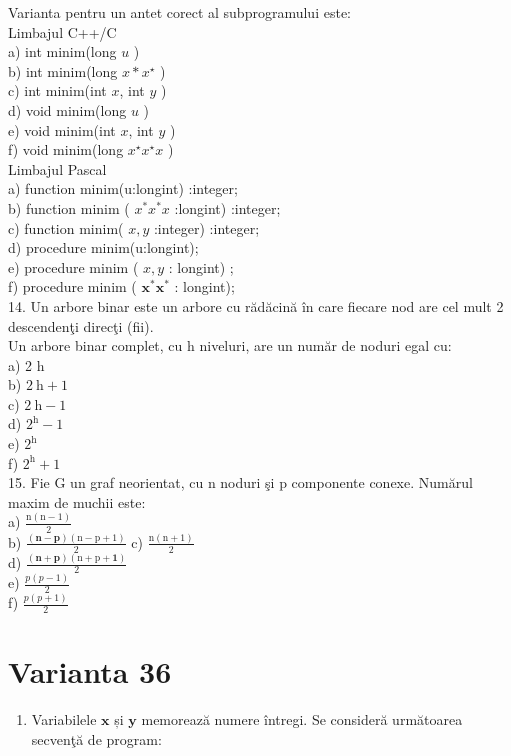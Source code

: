 \documentclass[10pt]{article}
\begin{document}
Varianta pentru un antet corect al subprogramului este:\\
Limbajul C++/C\\
a) int minim(long $u$ )\\
b) int minim(long $x * x^{\star}$ )\\
c) int minim(int $x$, int $y$ )\\
d) void minim(long $u$ )\\
e) void minim(int $x$, int $y$ )\\
f) void minim(long $x^{\star} x^{\star} x$ )\\
Limbajul Pascal\\
a) function minim(u:longint) :integer;\\
b) function minim ( $x^{*} x^{*} x$ :longint) :integer;\\
c) function minim( $x, y$ :integer) :integer;\\
d) procedure minim(u:longint);\\
e) procedure minim ( $x, y$ : longint) ;\\
f) procedure minim ( $\mathbf{x}^{*} \mathbf{x}^{*}$ : longint);\\
14. Un arbore binar este un arbore cu rădăcină în care fiecare nod are cel mult 2 descendenţi direcţi (fii).\\
Un arbore binar complet, cu h niveluri, are un număr de noduri egal cu:\\
a) 2 h\\
b) $2 \mathrm{~h}+1$\\
c) $2 \mathrm{~h}-1$\\
d) $2^{\mathrm{h}}-1$\\
e) $2^{\text {h }}$\\
f) $2^{\mathrm{h}}+1$\\
15. Fie G un graf neorientat, cu n noduri şi p componente conexe. Numărul maxim de muchii este:\\
a) $\frac{\mathrm{n}(\mathrm{n}-1)}{2}$\\
b) $\frac{(\mathbf{n}-\mathbf{p})(\mathrm{n}-\mathrm{p}+1)}{2}$ c) $\frac{\mathrm{n}(\mathrm{n}+1)}{2}$\\
d) $\frac{(\mathbf{n}+\mathbf{p})(\mathrm{n}+\mathrm{p}+\mathbf{1})}{2}$\\
e) $\frac{p(p-1)}{2}$\\
f) $\frac{p(p+1)}{2}$

\section*{Varianta 36}
\begin{enumerate}
  \item Variabilele $\mathbf{x}$ și $\mathbf{y}$ memorează numere întregi. Se consideră următoarea secvenţă de program:
\end{enumerate}
\end{document}
